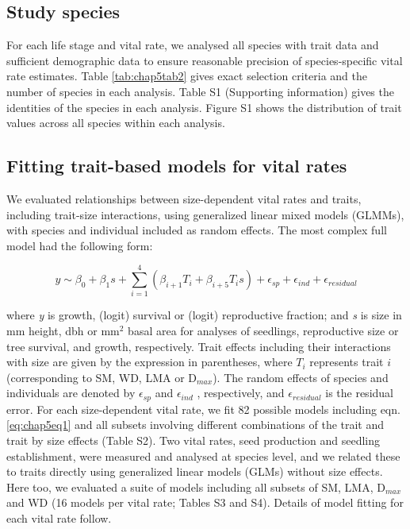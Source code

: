 \documentclass[b5paper,justified]{tufte-book} %
\begin{document}
\begin{fullwidth}
\subsection{Study species}
For each life stage and vital rate, we analysed all species with trait data and sufficient demographic data to ensure reasonable precision of species-specific vital rate estimates. Table \ref{tab:chap5tab2} gives exact selection criteria and the number of species in each analysis. Table S1 (Supporting information) gives the identities of the species in each analysis. Figure S1 shows the distribution of trait values across all species within each analysis.


\subsection{Fitting trait-based models for vital rates}
We evaluated relationships between size-dependent vital rates and traits, including trait-size interactions, using generalized linear mixed models (GLMMs), with species and individual included as random effects. The most complex full model had the following form:

\begin{equation}
y \sim \beta_0 + \beta_{1}s+\sum\limits_{i=1}^4 (\beta_{i+1}T_i + \beta_{i+5}T_is) + \epsilon_{sp} + \epsilon_{ind} + \epsilon_{residual}
\label{eq:chap5eq1}
\end{equation}

where \emph{y} is growth, (logit) survival or (logit) reproductive fraction; and \emph{s} is size in mm height, dbh or mm$^2$ basal area for analyses of seedlings, reproductive size or tree survival, and growth, respectively. Trait effects including their interactions with size are given by the expression in parentheses, where $T_i$ represents trait $i$ (corresponding to SM, WD, LMA or D$_{max}$). The random effects of species and individuals are denoted by $\epsilon_{sp}$ and $\epsilon_{ind}$ , respectively, and $\epsilon_{residual}$ is the residual error. For each size-dependent vital rate, we fit 82 possible models including eqn. \ref{eq:chap5eq1} and all subsets involving different combinations of the trait and trait by size effects (Table S2). Two vital rates, seed production and seedling establishment, were measured and analysed at species level, and we related these to traits directly using generalized linear models (GLMs) without size effects. Here too, we evaluated a suite of models including all subsets of SM, LMA, D$_{max}$and WD (16 models per vital rate; Tables S3 and S4). Details of model fitting for each vital rate follow.



\end{fullwidth}
\end{document}
